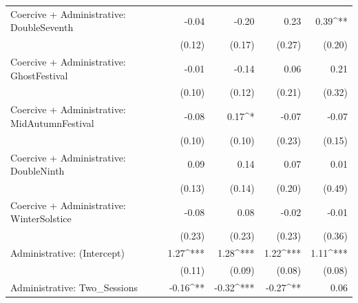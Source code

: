 \begin{table}
\begin{center}
\begin{tabular}{l D{.}{.}{6.5} D{.}{.}{6.5} D{.}{.}{6.5} D{.}{.}{6.5}}
Coercive + Administrative: DoubleSeventh             & -0.04                   & -0.20                   & 0.23                    & 0.39^{**}               \\
                                                     & (0.12)                  & (0.17)                  & (0.27)                  & (0.20)                  \\
Coercive + Administrative: GhostFestival             & -0.01                   & -0.14                   & 0.06                    & 0.21                    \\
                                                     & (0.10)                  & (0.12)                  & (0.21)                  & (0.32)                  \\
Coercive + Administrative: MidAutumnFestival         & -0.08                   & 0.17^{*}                & -0.07                   & -0.07                   \\
                                                     & (0.10)                  & (0.10)                  & (0.23)                  & (0.15)                  \\
Coercive + Administrative: DoubleNinth               & 0.09                    & 0.14                    & 0.07                    & 0.01                    \\
                                                     & (0.13)                  & (0.14)                  & (0.20)                  & (0.49)                  \\
Coercive + Administrative: WinterSolstice            & -0.08                   & 0.08                    & -0.02                   & -0.01                   \\
                                                     & (0.23)                  & (0.23)                  & (0.23)                  & (0.36)                  \\
Administrative: (Intercept)                          & 1.27^{***}              & 1.28^{***}              & 1.22^{***}              & 1.11^{***}              \\
                                                     & (0.11)                  & (0.09)                  & (0.08)                  & (0.08)                  \\
Administrative: Two\_Sessions                        & -0.16^{**}              & -0.32^{***}             & -0.27^{**}              & 0.06                    \\

\end{tabular}
\end{center}
\end{table}
